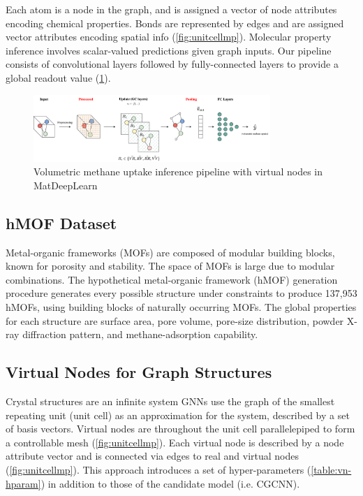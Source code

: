 \documentclass{lxaiproposal}
\begin{document}
Each atom is a node in the graph, and is assigned a vector of node attributes encoding chemical properties. Bonds are represented by edges and are assigned vector attributes encoding spatial info (\ref{fig:unitcellmp}). Molecular property inference involves scalar-valued predictions given graph inputs. Our pipeline consists of convolutional layers followed by fully-connected layers to provide a global readout value (\ref{fig:pipeline}).

\begin{figure}
    \centering
    \includegraphics[width=0.8\textwidth]{mdl-vn-pipeline.drawio.png}
    \caption{Volumetric methane uptake inference pipeline with virtual nodes in MatDeepLearn\cite{fung2021benchmarking}}
    \label{fig:pipeline}
\end{figure}

\subsection*{hMOF Dataset}

Metal-organic frameworks (MOFs) are composed of modular building blocks, known for porosity and stability. The space of  MOFs is large due to modular combinations. The hypothetical metal-organic framework (hMOF) generation procedure generates every possible structure under constraints to produce 137,953 hMOFs, using building blocks of naturally occurring MOFs. The global properties for each structure are surface area, pore volume, pore-size distribution, powder X-ray diffraction pattern, and methane-adsorption capability\cite{wilmer2012large}.

\subsection*{Virtual Nodes for Graph Structures}

Crystal structures are an infinite system GNNs use the graph of the smallest repeating unit (unit cell) as an approximation for the system, described by a set of basis vectors. Virtual nodes are throughout the unit cell parallelepiped to form a controllable mesh (\ref{fig:unitcellmp}). Each virtual node is described by a node attribute vector and is connected via edges to real and virtual nodes (\ref{fig:unitcellmp}). This approach introduces a set of hyper-parameters (\ref{table:vn-hparam}) in addition to those of the candidate model (i.e. CGCNN).
\end{document}
